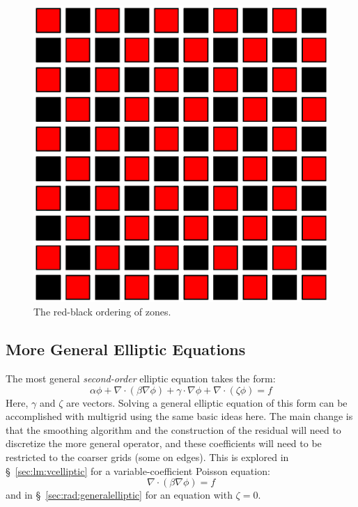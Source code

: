 \begin{figure}[t]
  \centering
  \includegraphics[width=0.6\linewidth]{rb}
  \caption[Red-black ordering of zones]
{\label{fig:rb} The red-black ordering of zones.}
\end{figure}





\subsection{More General Elliptic Equations}

The most general {\em second-order} elliptic equation takes the form:
\begin{equation}
  \alpha \phi + \nabla \cdot (\beta \nabla \phi) +
  \gamma \cdot \nabla \phi + \nabla \cdot (\zeta \phi) = f
\end{equation}
Here, $\gamma$ and $\zeta$ are vectors.  Solving a general elliptic
equation of this form can be accomplished with multigrid using the
same basic ideas here.  The main change is that the smoothing
algorithm and the construction of the residual will need to discretize
the more general operator, and these coefficients will need to
be restricted to the coarser grids (some on edges).  This is explored in
\S~\ref{sec:lm:vcelliptic} for a variable-coefficient Poisson equation:
 \begin{equation}
 \nabla \cdot (\beta \nabla \phi) = f
 \end{equation}
\ifdefined\debugmode
and in \S~\ref{sec:rad:generalelliptic} for an equation with $\zeta = 0$.
\fi
